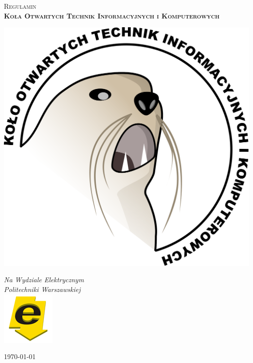 \documentclass[a4paper,11pt]{article}
\begin{document}
\begin{titlepage}

\begin{center}
		
	\vspace{20pt}
	\begin{doublespace}
		\begin{huge}
			\textsc{Regulamin \\ \textbf{Koła Otwartych Technik Informacyjnych i Komputerowych}}
		\end{huge}
	\end{doublespace}
	
	\vspace{40pt}
	
	\includegraphics[scale=0.4]{duzy-kotik.png}
	
	\vfill
	
	\textit{Na Wydziale Elektrycznym} \\
	\textit{Politechniki Warszawskiej} \\
	\vspace{10pt}
	\includegraphics[scale=0.3]{ee.jpg}
		
	\vfill
	
	\today
\end{center}

\end{titlepage}
\end{document}
